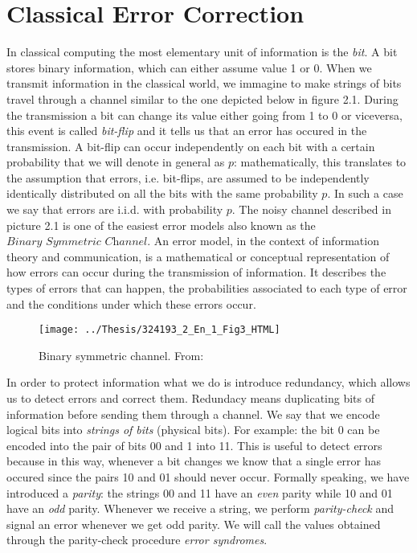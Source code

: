 \documentclass{Configuration_Files/PoliMi3i_thesis}
\begin{document}
\section{Classical Error Correction}
\label{sec:CER}

In classical computing the most elementary unit of information is the {\it bit}. A bit stores binary information, which can either assume value 1 or 0. When we transmit information in the classical world, we immagine to make strings of bits travel through a channel similar to the one depicted below in figure 2.1. During the transmission a bit can change its value either going from 1 to 0 or viceversa, this event is called {\it bit-flip} and it tells us that an error has occured in the transmission. A bit-flip can occur independently on each bit with a certain probability that we will denote in general as $p$: mathematically, this translates to the assumption that errors, i.e. bit-flips,  are assumed to be independently identically distributed on all the bits with the same probability $p$. In such a case we say that errors are i.i.d. with probability $p$.\newline
The noisy channel described in picture 2.1 is one of the easiest error models also known as the $\textit{Binary Symmetric Channel}$. An error model, in the context of information theory and communication, is a mathematical or conceptual representation of how errors can occur during the transmission of information. It describes the types of errors that can happen, the probabilities associated to each type of error and the conditions under which these errors occur. \newline

\begin{figure}
	\centering
	\texttt{[image: ../Thesis/324193\_2\_En\_1\_Fig3\_HTML]}
	\caption{{ Binary symmetric channel. From: \cite{Cha06}}}
	\label{fig:3241932en1fig3html}
\end{figure}


\newpage
In order to protect information what we do is introduce redundancy, which allows us to detect errors and correct them. Redundacy means duplicating bits of information before sending them through a channel. We say that we encode logical bits into {\it strings of bits} (physical bits). For example: the bit 0 can be encoded into the pair of bits 00 and 1 into 11. This is useful to detect errors because in this way, whenever a bit changes we know that a single error has occured since the pairs 10 and 01 should never occur. Formally speaking, we have introduced a {\it parity}: the strings 00 and 11 have an {\it even} parity while 10 and 01 have an {\it odd} parity. Whenever we receive a string, we perform {\it parity-check} and signal an error whenever we get odd parity. We will call the values obtained through the parity-check procedure {\it error syndromes}.\newline
\end{document}
